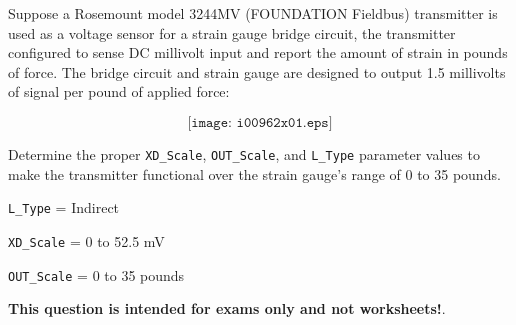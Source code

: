 

Suppose a Rosemount model 3244MV (FOUNDATION Fieldbus) transmitter is used as a voltage sensor for a strain gauge bridge circuit, the transmitter configured to sense DC millivolt input and report the amount of strain in pounds of force.  The bridge circuit and strain gauge are designed to output 1.5 millivolts of signal per pound of applied force:

$$\texttt{[image: i00962x01.eps]}$$

Determine the proper {\tt XD\_Scale}, {\tt OUT\_Scale}, and {\tt L\_Type} parameter values to make the transmitter functional over the strain gauge's range of 0 to 35 pounds.







{\tt L\_Type} = Indirect

\vskip 10pt

{\tt XD\_Scale} = 0 to 52.5 mV

\vskip 10pt

{\tt OUT\_Scale} = 0 to 35 pounds







{\bf This question is intended for exams only and not worksheets!}.



